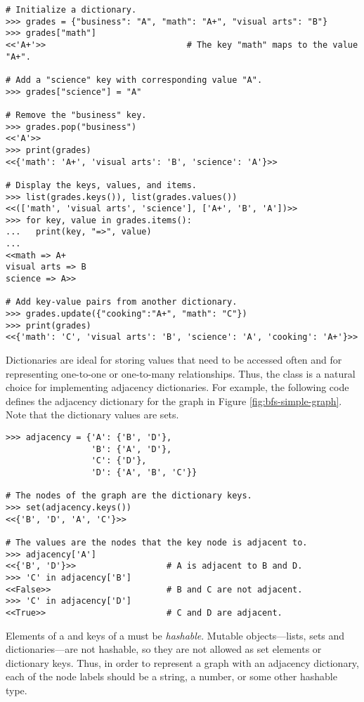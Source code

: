 \begin{lstlisting}
# Initialize a dictionary.
>>> grades = {"business": "A", "math": "A+", "visual arts": "B"}
>>> grades["math"]
<<'A+'>>                            # The key "math" maps to the value "A+".

# Add a "science" key with corresponding value "A".
>>> grades["science"] = "A"

# Remove the "business" key.
>>> grades.pop("business")
<<'A'>>
>>> print(grades)
<<{'math': 'A+', 'visual arts': 'B', 'science': 'A'}>>

# Display the keys, values, and items.
>>> list(grades.keys()), list(grades.values())
<<(['math', 'visual arts', 'science'], ['A+', 'B', 'A'])>>
>>> for key, value in grades.items():
...   print(key, "=>", value)
...
<<math => A+
visual arts => B
science => A>>

# Add key-value pairs from another dictionary.
>>> grades.update({"cooking":"A+", "math": "C"})
>>> print(grades)
<<{'math': 'C', 'visual arts': 'B', 'science': 'A', 'cooking': 'A+'}>>
\end{lstlisting}

Dictionaries are ideal for storing values that need to be accessed often and for representing one-to-one or one-to-many relationships.
Thus, the  class is a natural choice for implementing adjacency dictionaries.
For example, the following code defines the adjacency dictionary for the graph in Figure \ref{fig:bfs-simple-graph}.
Note that the dictionary values are sets.

\begin{lstlisting}
>>> adjacency = {'A': {'B', 'D'},
                 'B': {'A', 'D'},
                 'C': {'D'},
                 'D': {'A', 'B', 'C'}}

# The nodes of the graph are the dictionary keys.
>>> set(adjacency.keys())
<<{'B', 'D', 'A', 'C'}>>

# The values are the nodes that the key node is adjacent to.
>>> adjacency['A']
<<{'B', 'D'}>>                  # A is adjacent to B and D.
>>> 'C' in adjacency['B']
<<False>>                       # B and C are not adjacent.
>>> 'C' in adjacency['D']
<<True>>                        # C and D are adjacent.
\end{lstlisting}

\begin{warn} %
Elements of a  and keys of a  must be \emph{hashable}.
Mutable objects---lists, sets and dictionaries---are not hashable, so they are not allowed as set elements or dictionary keys.
Thus, in order to represent a graph with an adjacency dictionary, each of the node labels should be a string, a number, or some other hashable type.
\end{warn}


